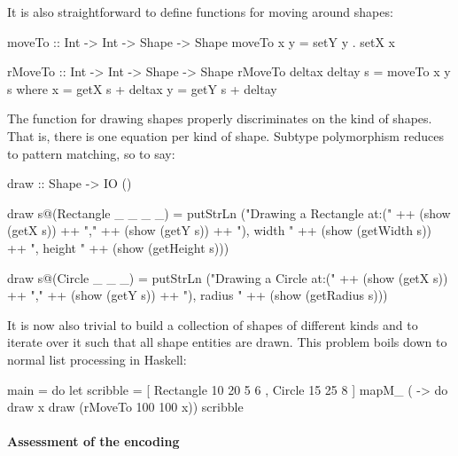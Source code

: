 \documentclass{jfp}
\begin{document}
It is also straightforward to define functions for moving around shapes:

\begin{code}
 moveTo :: Int -> Int -> Shape -> Shape
 moveTo x y = setY y . setX x 
\end{code}

\begin{code}
 rMoveTo :: Int -> Int -> Shape -> Shape
 rMoveTo deltax deltay s = moveTo x y s
  where
   x = getX s + deltax
   y = getY s + deltay
\end{code}

The function for drawing shapes properly discriminates on the kind of
shapes. That is, there is one equation per kind of shape. Subtype polymorphism
reduces to pattern matching, so to say:

\begin{code}
 draw :: Shape -> IO ()
\end{code}

\begin{code}
 draw s@(Rectangle _ _ _ _)
          =  putStrLn ("Drawing a Rectangle at:("
          ++ (show (getX s))
          ++ ","
          ++ (show (getY s))
          ++ "), width " ++ (show (getWidth s))
          ++ ", height " ++ (show (getHeight s)))
\end{code}

\begin{code}
 draw s@(Circle _ _ _)
          =  putStrLn ("Drawing a Circle at:("
          ++ (show (getX s))
          ++ ","
          ++ (show (getY s))
          ++ "), radius "
          ++ (show (getRadius s)))
\end{code}

It is now also trivial to build a collection of shapes of different
kinds and to iterate over it such that all shape entities are drawn.
This problem boils down to normal list processing in Haskell:

\begin{code}
 main =
       do
          let scribble = [ Rectangle 10 20 5 6
                         , Circle 15 25 8
                         ]
          mapM_ ( \x -> 
                    do
                       draw x
                       draw (rMoveTo 100 100 x))
                scribble
\end{code}



\paragraph{Assessment of the encoding}
\end{document}
